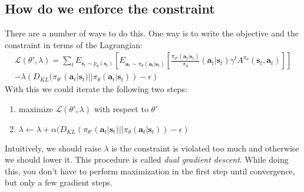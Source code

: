 \documentclass{report}
\begin{document}
\subsection{How do we enforce the constraint}
There are a number of ways to do this.
One way is to write the objective and the constraint in terms of the Lagrangian:
\begin{equation}
		\begin{split}
\mathcal{L} (\theta', \lambda) =
\sum_{t}^{} E_{ \bm{s}_{t}\sim p_{ \theta } (\bm{s}_{t})}
\left[ E_{ \bm{a}_{t} \sim \pi_{ \theta }(\bm{a}_{t}| \bm{s}_{t} ) } 
\left[ \frac{\pi_{ \theta' }(\bm{a}_{t}| \bm{s}_{t} )}{\pi_\theta} (\bm{a}_{t}| \bm{s}_{t} )\gamma^{ t } A^{ \pi_{ \theta } } (\bm{s}_{t}, \bm{a}_{t} ) \right] 
\right] \\
- \lambda \left( 
D_{ KL } (\pi_{ \theta' } (\bm{a}_{t}| \bm{s}_{t} ) || \pi_{ \theta }(\bm{a}_{t}| \bm{s}_{t} ) )
 - \epsilon \right) 
		\end{split}
\end{equation}
With this we could iterate the following two steps:
\begin{enumerate}
		\item maximize $ \mathcal{L} (\theta', \lambda)  $ with respect to $ \theta'  $
		\item $ \lambda \leftarrow \lambda + \alpha (D_{ KL } (\pi_{ \theta' } (\bm{a}_{t}| \bm{s}_{t} ) || \pi_{ \theta }(\bm{a}_{t}| \bm{s}_{t} )) -\epsilon)  $
\end{enumerate}
Intuitively, we should raise $ \lambda   $ is the constraint is violated too much
and otherwise we should lower it.
This procedure is called \textit{dual gradient descent}.
While doing this, you don't have to perform maximization in the first step until convergence,
but only a few gradient steps.
\end{document}
